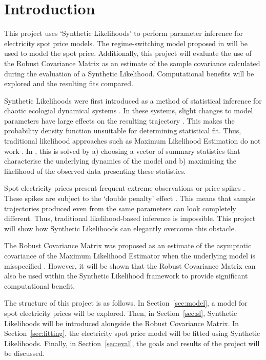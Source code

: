 \section{Introduction}

This project uses `Synthetic Likelihoods' \citep{wood_2010} to perform parameter inference for electricity spot price models. The regime-switching model proposed in \cite{huisman_mahieu_2003} will be used to model the spot price. Additionally, this project will evaluate the use of the Robust Covariance Matrix \citep{huber_1967} as an estimate of the sample covariance calculated during the evaluation of a Synthetic Likelihood. Computational benefits will be explored and the resulting fits compared.

Synthetic Likelihoods were first introduced as a method of statistical inference for chaotic ecologial dynamical systems \citep{wood_2010}. In these systems, slight changes to model parameters have large effects on the resulting trajectory \citep{may_1976}. This makes the probability density function unsuitable for determining statistical fit. Thus, traditional likelihood approaches such as Maximum Likelihood Estimation do not work \citep{wood_2010}. In \cite{wood_2010}, this is solved by a) choosing a vector of summary statistics that characterise the underlying dynamics of the model and b) maximising the likelihood of the observed data presenting these statistics.

Spot electricity prices present frequent extreme observations or price spikes \citep[p.~21]{pilipovic_2007}. These spikes are subject to the `double penalty' effect \citep{haben_2014}. This means that sample trajectories produced even from the same parameters can look completely different. Thus, traditional likelihood-based inference is impossible. This project will show how Synthetic Likelihoods can elegantly overcome this obstacle.

The Robust Covariance Matrix was proposed as an estimate of the asymptotic covariance of the Maximum Likelihood Estimator when the underlying model is misspecified \citep{huber_1967}. However, it will be shown that the Robust Covariance Matrix can also be used within the Synthetic Likelihood framework to provide significant computational benefit.

The structure of this project is as follows. In Section~\ref{sec:model}, a model for spot electricity prices will be explored. Then, in Section~\ref{sec:sl}, Synthetic Likelihoods will be introduced alongside the Robust Covariance Matrix. In Section~\ref{sec:fitting}, the electricity spot price model will be fitted using Synthetic Likelihoods. Finally, in Section~\ref{sec:eval}, the goals and results of the project will be discussed.